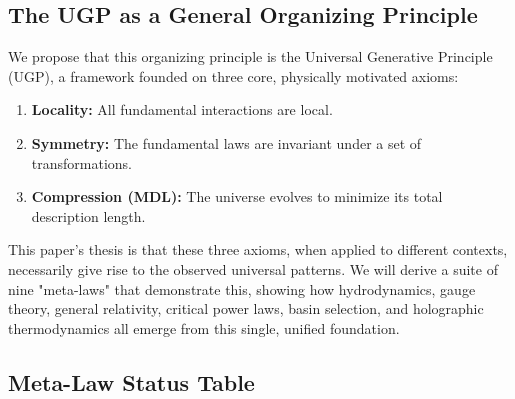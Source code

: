\documentclass[11pt]{article}
\begin{document}
\subsection{The UGP as a General Organizing Principle}
We propose that this organizing principle is the Universal Generative Principle (UGP), a framework founded on three core, physically motivated axioms:
\begin{enumerate}[leftmargin=2.5em,itemsep=0.2em,label=\textbf{A\arabic*}:]
    \item \textbf{Locality:} All fundamental interactions are local.
    \item \textbf{Symmetry:} The fundamental laws are invariant under a set of transformations.
    \item \textbf{Compression (MDL):} The universe evolves to minimize its total description length.
\end{enumerate}
This paper's thesis is that these three axioms, when applied to different contexts, necessarily give rise to the observed universal patterns. We will derive a suite of nine "meta-laws" that demonstrate this, showing how hydrodynamics, gauge theory, general relativity, critical power laws, basin selection, and holographic thermodynamics all emerge from this single, unified foundation.

\subsection{Meta-Law Status Table}
\end{document}
